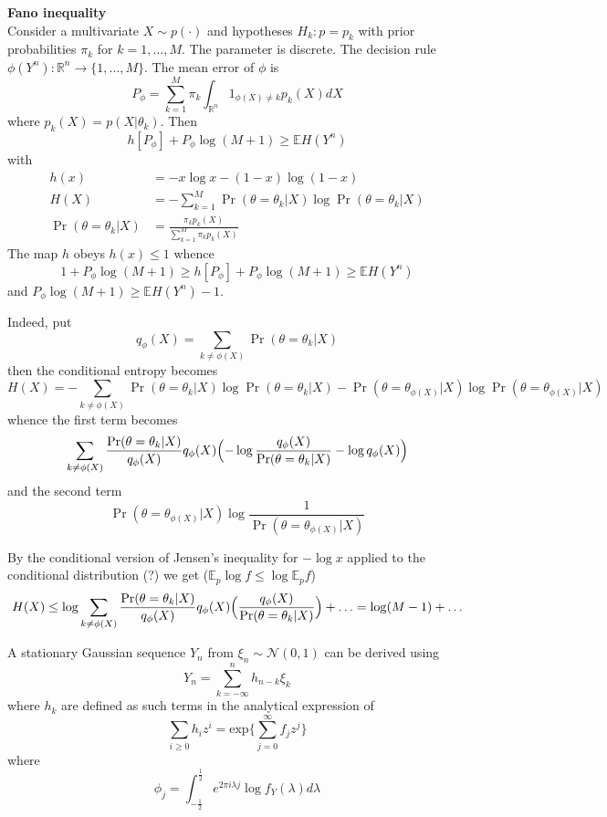 \documentclass[a4paper]{article}
\newcommand{\Real}{\mathbb{R}}
\newcommand{\Ncal}{\mathcal{N}}
\newcommand{\ex}{\mathbb{E}}
\begin{document}
\noindent\textbf{Fano inequality}\hfill\\
Consider a multivariate $X\sim p(\cdot)$ and hypotheses $H_k: p=p_k$ with prior
probabilities $\pi_k$ for $k=1,\ldots, M$. The parameter is discrete. The decision
rule $\phi(Y^n):\Real^n\to \{1,\ldots,M\}$. The mean error of $\phi$ is
\[P_\phi = \sum_{k=1}^M \pi_k \int_{\Real^n} 1_{\phi(X)\neq k} p_k(X) dX\]
where $p_k(X) = p(X\rvert \theta_k)$. Then
\[h[P_\phi] + P_\phi \log(M+1 )\geq \ex H(Y^n)\]
with
\begin{align*}
	h(x) &= - x \log x - (1-x) \log (1-x)\\
	H(X) &= - \sum_{k=1}^M \Pr(\theta=\theta_k\rvert X) \log \Pr(\theta=\theta_k\rvert X)\\
	\Pr(\theta=\theta_k\rvert X) &= \frac{\pi_k p_k(X)}{\sum_{k=1}^M \pi_k p_k(X)}
\end{align*}
The map $h$ obeys $h(x)\leq 1$ whence
\[1+P_\phi \log(M+1 )\geq h[P_\phi] + P_\phi \log(M+1)\geq \ex H(Y^n)\]
and $P_\phi \log(M+1)\geq \ex H(Y^n)-1$.

Indeed, put 
\[q_{\phi}(X) = \sum_{k\neq \phi(X)}\Pr(\theta=\theta_k\rvert X)\]
then the conditional entropy becomes
\[
H(X)
= - \sum_{k\neq \phi(X)} \Pr(\theta=\theta_k\rvert X) \log \Pr(\theta=\theta_k\rvert X)
- \Pr(\theta=\theta_{\phi(X)}\rvert X) \log \Pr(\theta=\theta_{\phi(X)}\rvert X)
\]
whence the first term becomes
\[
\sum_{k\neq \phi(X)}
\frac{\Pr(\theta=\theta_k\rvert X)}{q_{\phi}(X)} q_{\phi}(X) \Bigl(
-\log \frac{q_{\phi}(X)}{\Pr(\theta=\theta_k\rvert X)} - \log q_{\phi}(X)
\Bigr)
\]
and the second term
\[
\Pr(\theta=\theta_{\phi(X)}\rvert X) \log \frac{1}{\Pr(\theta=\theta_{\phi(X)}\rvert X)}
\]

By the conditional version of Jensen's inequality for $-\log x$ applied to the
conditional distribution (?) we get ($\ex_p \log f \leq \log \ex_p f$)
\[
H(X)
\leq  \log \sum_{k\neq \phi(X)} \frac{\Pr(\theta=\theta_k\rvert X)}{q_{\phi}(X)} q_{\phi}(X)
\Bigl(\frac{q_{\phi}(X)}{\Pr(\theta=\theta_k\rvert X)}\Bigr)
+ \ldots
= \log(M-1) + \ldots
\]


A stationary Gaussian sequence $Y_n$ from $\xi_n\sim \Ncal(0,1)$ can be derived
using
\[
Y_n = \sum_{k=-\infty}^n h_{n-k} \xi_k
\]
where $h_k$ are defined as such terms in the analytical expression of 
\[
\sum_{i\geq 0} h_i z^i = \text{exp}\{ \sum_{j=0}^\infty f_j z^j \}
\]
where
\[\phi_j = \int_{-\frac{1}{2}}^{\frac{1}{2}} e^{2\pi i \lambda j } \log f_Y( \lambda ) d\lambda \]

\end{document}
